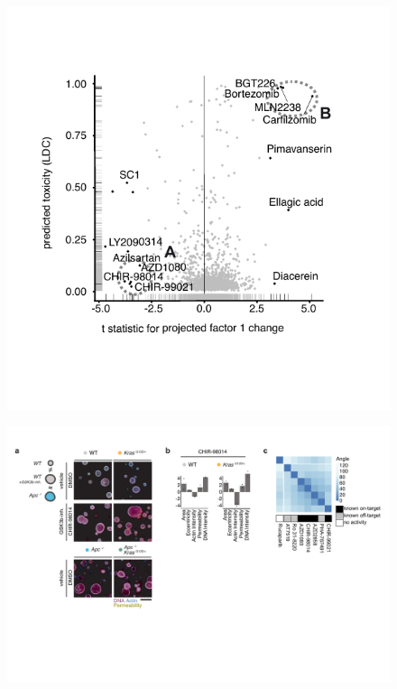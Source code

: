 \begin{flushleft}
\begin{figure}[h]
\centering
\includegraphics[width=\textwidth,
                height=\textheight,
                keepaspectratio]{figures/adenomaprofiling/pdf/fig_2_3.pdf}
\caption{}
\label{fig_180}
\end{figure}
\bigbreak

\begin{figure}[h]
\centering
\includegraphics[width=\textwidth,
                height=\textheight,
                keepaspectratio]{figures/adenomaprofiling/pdf/fig_2_4.pdf}
\caption{}
\label{fig_180}
\end{figure}
\bigbreak


\end{flushleft}
